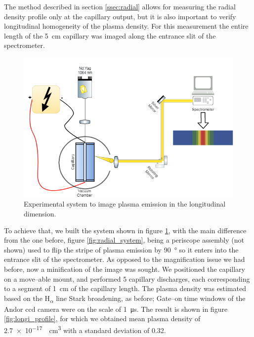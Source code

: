 \documentclass[../main.tex]{subfiles}
\begin{document}
The method described in section \ref{ssec:radial} allows for measuring the radial density profile only at the capillary output, but it is also important to verify longitudinal homogeneity of the plasma density. For this measurement the entire length of the \SI{5}{\cm} capillary was imaged along the entrance slit of the spectrometer.
\begin{figure}
    \centering
    \includegraphics[width=\textwidth]{figures/spectro/longitudinal_system.png}
    \caption{Experimental system to image plasma emission in the longitudinal dimension.}
    \label{fig:longi_system}
\end{figure}

To achieve that, we built the system shown in figure \ref{fig:longi_system}, with the main difference from the one before, figure \ref{fig:radial_system}, being a periscope assembly (not shown) used to flip the stripe of plasma emission by \SI{90}{\degree} so it enters into the entrance slit of the spectrometer. As opposed to the magnification issue we had before, now a minification of the image was sought. We positioned the capillary on a move--able mount, and performed 5 capillary discharges, each corresponding to a segment of \SI{1}{\cm} of the capillary length. The plasma density was estimated based on the H\textsubscript{$\alpha$} line Stark broadening, as before; Gate--on time windows of the Andor ccd camera were on the scale of \SI{1}{\us}. The result is shown in figure \ref{fig:longi_profile}, for which we obtained mean plasma density of \SI{2.7e-17}{\per\cubic\cm} with a standard deviation of 0.32.
\end{document}
